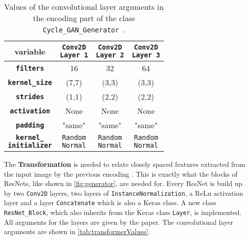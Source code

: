 \documentclass[fleqn,10pt]{SelfArx} %
\begin{document}
\begin{table}[htb]
\centering
\caption{Values of the convolutional layer arguments in the encoding part of the class \texttt{Cycle\_GAN\_Generator}~\cite{image-to-image-ccan}.}
\label{tab:encoderValues}
\begin{tabular}{c c c c}
\textbf{variable} & \makecell[cc]{\textbf{\texttt{Conv2D}} \\ \textbf{\texttt{Layer 1}}} & \makecell[cc]{\textbf{\texttt{Conv2D}} \\ \textbf{\texttt{Layer 2}}} & \makecell[cc]{\textbf{\texttt{Conv2D}} \\ \textbf{\texttt{Layer 3}}} \\ \hline
\textbf{\texttt{filters}} & 16 & 32 & 64 \\ \hline
\textbf{\texttt{kernel\_size}} & (7,7) & (3,3) & (3,3) \\ \hline
\textbf{\texttt{strides}} & (1,1) &  (2,2) & (2,2) \\ \hline
\textbf{\texttt{activation}} & None & None & None \\ \hline 
\textbf{\texttt{padding}} & "same" & "same" & "same" \\ \hline
\makecell[cc]{\textbf{\texttt{kernel\_}} \\ \textbf{\texttt{initializer}}} & \makecell[cc]{\texttt{Random} \\ \texttt{Normal}} & \makecell[cc]{\texttt{Random} \\ \texttt{Normal}} & \makecell[cc]{\texttt{Random} \\ \texttt{Normal}} \\ \hline
\end{tabular}
\end{table}

The \textbf{Transformation} is needed to relate closely spaced features extracted from the input image by the previous encoding \cite{Introduction-to-Cycle-GANs}. This is exactly what the blocks of \acp{ResNet}, like shown in \autoref{fig:generator}, are needed for. Every \ac{ResNet} is build up by two \texttt{Conv2D} layers, two layers of \texttt{Instance\-Normalization}, a \ac{ReLu} activation layer and a layer \texttt{Concatenate} which is also a Keras class. A new class \texttt{ResNet\-\_Block}, which also inherits from the Keras class \texttt{Layer}, is implemented. All arguments for the layers are given by the paper. The convolutional layer arguments are shown in \autoref{tab:transformerValues}.
\end{document}
